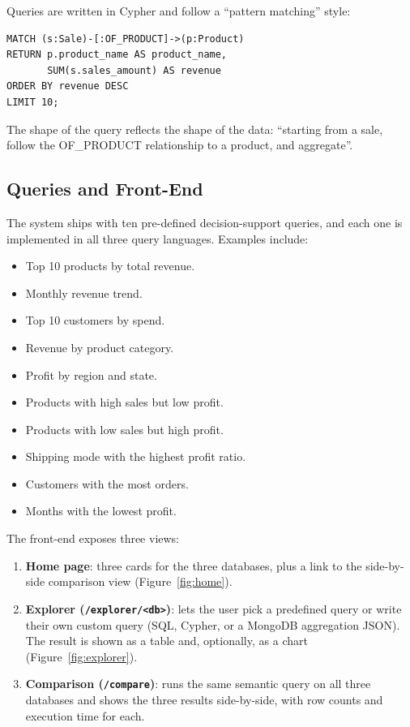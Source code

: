 \documentclass[11pt,a4paper]{article}
\begin{document}
Queries are written in Cypher and follow a ``pattern matching'' style:

\begin{lstlisting}[caption={Cypher: top 10 products by revenue}]
MATCH (s:Sale)-[:OF_PRODUCT]->(p:Product)
RETURN p.product_name AS product_name,
       SUM(s.sales_amount) AS revenue
ORDER BY revenue DESC
LIMIT 10;
\end{lstlisting}

The shape of the query reflects the shape of the data: ``starting from a
sale, follow the OF\_PRODUCT relationship to a product, and aggregate''.

\subsection{Queries and Front-End}

The system ships with ten pre-defined decision-support queries, and each one
is implemented in all three query languages. Examples include:

\begin{itemize}[leftmargin=*]
    \item Top 10 products by total revenue.
    \item Monthly revenue trend.
    \item Top 10 customers by spend.
    \item Revenue by product category.
    \item Profit by region and state.
    \item Products with high sales but low profit.
    \item Products with low sales but high profit.
    \item Shipping mode with the highest profit ratio.
    \item Customers with the most orders.
    \item Months with the lowest profit.
\end{itemize}

The front-end exposes three views:

\begin{enumerate}[leftmargin=*]
    \item \textbf{Home page}: three cards for the three databases, plus a
          link to the side-by-side comparison view
          (Figure~\ref{fig:home}).
    \item \textbf{Explorer (\texttt{/explorer/<db>})}: lets the user pick a
          predefined query or write their own custom query (SQL, Cypher, or
          a MongoDB aggregation JSON). The result is shown as a table and,
          optionally, as a chart (Figure~\ref{fig:explorer}).
    \item \textbf{Comparison (\texttt{/compare})}: runs the same semantic
          query on all three databases and shows the three results
          side-by-side, with row counts and execution time for each.
\end{enumerate}
\end{document}
